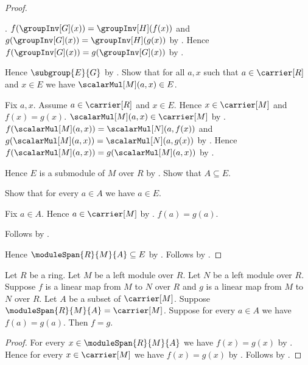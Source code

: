 \begin{proof}
\begin{subproof}
            .
        $f(\groupInv[G](x))=\groupInv[H](f(x))$ and
            $g(\groupInv[G](x))=\groupInv[H](g(x))$ by
            .
        Hence $f(\groupInv[G](x))=g(\groupInv[G](x))$ by
            \auto.
    \end{subproof}
    Hence $\subgroup{E}{G}$ by .
    Show that for all $a,x$ such that $a\in\carrier[R]$ and $x\in E$
        we have $\scalarMul[M](a,x)\in E$.
    \begin{subproof}
        Fix $a,x$.
        Assume $a\in\carrier[R]$ and $x\in E$.
        Hence $x\in\carrier[M]$ and $f(x)=g(x)$.
        $\scalarMul[M](a,x)\in\carrier[M]$ by
            .
        $f(\scalarMul[M](a,x))=\scalarMul[N](a,f(x))$ and
            $g(\scalarMul[M](a,x))=\scalarMul[N](a,g(x))$ by
            .
        Hence $f(\scalarMul[M](a,x))=g(\scalarMul[M](a,x))$ by
            \auto.
    \end{subproof}
    Hence $E$ is a submodule of $M$ over $R$ by .
    Show that $A\subseteq E$.
    \begin{subproof}
        Show that for every $a\in A$ we have $a\in E$.
        \begin{subproof}
            Fix $a\in A$.
            Hence $a\in\carrier[M]$ by .
            $f(a)=g(a)$.
        \end{subproof}
        Follows by .
    \end{subproof}
    Hence $\moduleSpan{R}{M}{A}\subseteq E$ by
        .
    Follows by .
\end{proof}

\begin{theorem}\label{linear_map_equality_from_spanning_set}
    Let $R$ be a ring.
    Let $M$ be a left module over $R$.
    Let $N$ be a left module over $R$.
    Suppose $f$ is a linear map from $M$ to $N$ over $R$ and
        $g$ is a linear map from $M$ to $N$ over $R$.
    Let $A$ be a subset of $\carrier[M]$.
    Suppose $\moduleSpan{R}{M}{A}=\carrier[M]$.
    Suppose for every $a\in A$ we have $f(a)=g(a)$.
    Then $f=g$.
\end{theorem}
\begin{proof}
    For every $x\in\moduleSpan{R}{M}{A}$ we have $f(x)=g(x)$ by
        .
    Hence for every $x\in\carrier[M]$ we have $f(x)=g(x)$ by
        \auto.
    Follows by .
\end{proof}
